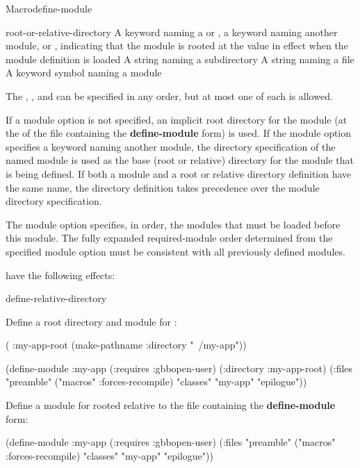 \documentclass[10pt,twoside,english,pdftex]{article}
\begin{document}
\begin{functiondoc}{Macro}{define-module}{\superstar}
\fnterms
\begin{args}{root-or-relative-directory}
 A keyword naming a  or
  , a keyword naming another module, or \nil{},
  indicating that the module is rooted at the  value in
  effect when the module definition is loaded
\arg[subdirectory] A string naming a subdirectory
 A string naming a file
 A keyword symbol naming a module 
\end{args}

\fndescription The  ,
, and  can be specified in any order,
but at most one of each is allowed.

If a  module option is not specified, an implicit root
directory for the module (at the  of the file containing
the \textbf{define-module} form) is used.  If the  module
option specifies a keyword naming another module, the directory specification
of the named module is used as the base (root or relative) directory for the
module that is being defined.  If both a module and a root or relative directory
definition have the same name, the directory definition takes precedence over
the module directory specification.

The  module option specifies, in order, the modules that must
be loaded before this module.  The fully expanded required-module order
determined from the specified  module option must be
consistent with all previously defined modules.

 have the following effects: \compilemodulefileoptions

\begin{alsos}{define-relative-directory}
\end{alsos}

\fnexamples
{}%
Define a root directory and module for :
\begin{example}
  ( :my-app-root 
    (make-pathname :directory "~/my-app"))

  (define-module :my-app
    (:requires :gbbopen-user)
    (:directory :my-app-root)
    (:files "preamble"
            ("macros" :forces-recompile)
            "classes"
            "my-app"
            "epilogue"))
\end{example}

Define a module for  rooted relative to the file 
containing the \textbf{define-module} form:
\begin{example}
  (define-module :my-app
    (:requires :gbbopen-user)
    (:files "preamble"
            ("macros" :forces-recompile)
            "classes"
            "my-app"
            "epilogue"))
\end{example}

\end{functiondoc}
\end{document}
